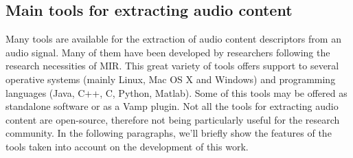 \subsection{Main tools for extracting audio content}
Many tools are available for the extraction of audio content descriptors from an audio signal. Many of them have been developed by researchers following the research necessities of MIR. This great variety of tools offers support to several operative systems (mainly Linux, Mac OS X and Windows) and programming languages (Java, C++, C, Python, Matlab). Some of this tools may be offered as standalone software or as a Vamp plugin. Not all the tools for extracting audio content are open-source, therefore not being particularly useful for the research community. In the following paragraphs, we'll briefly show the features of the tools taken into account on the development of this work.


